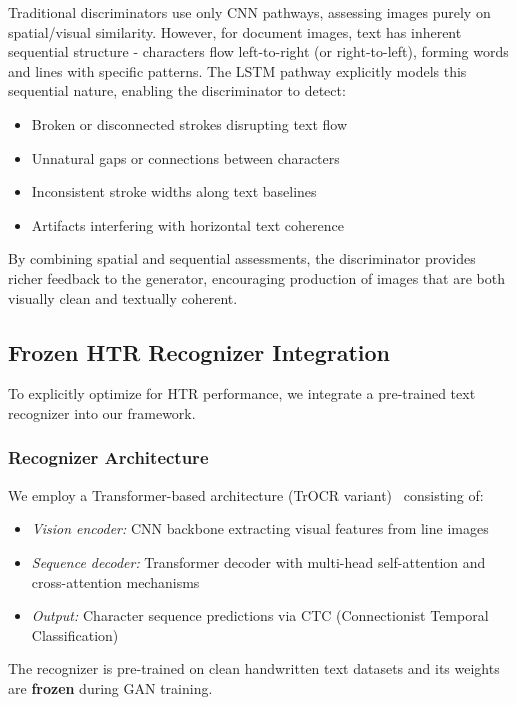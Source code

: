 \documentclass[journal]{IEEEtran}
\begin{document}
Traditional discriminators use only CNN pathways, assessing images purely on spatial/visual similarity. However, for document images, text has inherent sequential structure - characters flow left-to-right (or right-to-left), forming words and lines with specific patterns. The LSTM pathway explicitly models this sequential nature, enabling the discriminator to detect:
\begin{itemize}
    \item Broken or disconnected strokes disrupting text flow
    \item Unnatural gaps or connections between characters
    \item Inconsistent stroke widths along text baselines
    \item Artifacts interfering with horizontal text coherence
\end{itemize}

By combining spatial and sequential assessments, the discriminator provides richer feedback to the generator, encouraging production of images that are both visually clean and textually coherent.

\subsection{Frozen HTR Recognizer Integration}

To explicitly optimize for HTR performance, we integrate a pre-trained text recognizer into our framework.

\subsubsection{Recognizer Architecture}

We employ a Transformer-based architecture (TrOCR variant)~\cite{li2021trocr} consisting of:
\begin{itemize}
    \item \textit{Vision encoder:} CNN backbone extracting visual features from line images
    \item \textit{Sequence decoder:} Transformer decoder with multi-head self-attention and cross-attention mechanisms
    \item \textit{Output:} Character sequence predictions via CTC (Connectionist Temporal Classification)
\end{itemize}

The recognizer is pre-trained on clean handwritten text datasets and its weights are \textbf{frozen} during GAN training.
\end{document}

